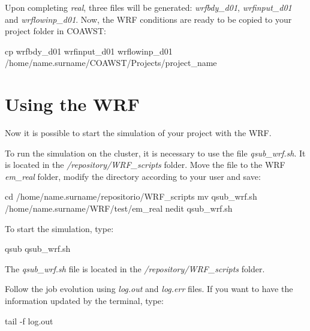 \noindent Upon completing \textit{real}, three files will be generated: \textit{wrfbdy\_d01}, \textit{wrfinput\_d01} and 
\textit{wrflowinp\_d01}. Now, the WRF conditions are ready to be copied to your project
folder in COAWST:
\bigskip

\begin{bashcode}[fontsize=\scriptsize]
cp wrfbdy_d01 wrfinput_d01 wrflowinp_d01 /home/name.surname/COAWST/Projects/project_name
\end{bashcode}
\bigskip

\section{Using the WRF}\label{wrfsecao2}
\bigskip

\noindent Now it is possible to start the simulation of your project with the WRF.
\bigskip

\noindent To run the simulation on the cluster, it is necessary to use the file \textit{qsub\_wrf.sh}. It is located in the 
\textit{/repository/WRF\_scripts} folder. Move the file to the WRF \textit{em\_real} folder, modify the directory according
to your user and save:
\bigskip

\begin{bashcode}
cd /home/name.surname/repositorio/WRF_scripts
mv qsub_wrf.sh /home/name.surname/WRF/test/em_real
nedit qsub_wrf.sh
\end{bashcode}
\bigskip

\noindent To start the simulation, type:
\bigskip

\begin{bashcode}
qsub qsub_wrf.sh
\end{bashcode}
\bigskip

\begin{tcolorbox}[enhanced,
  grow to left by=0cm,%
  grow to right by=0cm,%
  enlarge top by=0cm,%
  enlarge bottom by=0cm,%
  tcbox raise base,
  boxrule=1.0pt,
  left=18mm,
  colframe=yellow!50!black,coltext=yellow!25!black,colback=yellow!10!white,
  overlay={\begin{tcbclipinterior}\fill[yellow!75!blue!50!white] (frame.south west)
    rectangle node[text=white,font=\sffamily\bfseries\footnotesize,rotate=0] {ATTENTION} ([xshift=18mm]frame.north west);\end{tcbclipinterior}}]
The \textit{qsub\_wrf.sh} file is located in the \textit{/repository/WRF\_scripts} folder.
\end{tcolorbox}
\bigskip

\noindent Follow the job evolution using \textit{log.out} and \textit {log.err} files. If you want to have the information 
updated by the terminal, type:
\bigskip

\begin{bashcode}
tail -f log.out
\end{bashcode}
\bigskip
